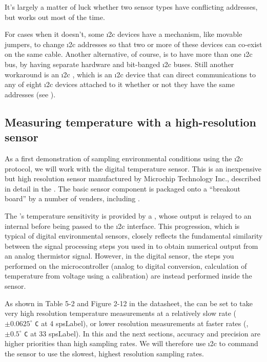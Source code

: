 It's largely a matter of luck whether two sensor types have conflicting addresses, but works out most of the time.

For cases when it doesn't, some \i2c devices have a mechanism, like movable jumpers, to change \i2c addresses so that two or more of these devices can co-exist on the same cable.
Another alternative, of course, is to have more than one \i2c bus, \eg by having separate hardware and bit-banged \i2c buses.
Still another workaround is an \i2c , which is an \i2c device that can direct communications to any of eight \i2c devices attached to it whether or  not they have the same addresses (see ).

\subsection{ Measuring temperature with a high-resolution sensor }
As a first demonstration of sampling environmental conditions using the \i2c protocol, we will work with the  digital temperature sensor.
This is an inexpensive but high resolution sensor manufactured by Microchip Technology Inc., described in detail in the .
The basic sensor component is packaged onto a ``breakout board'' by a number of venders, including .

The 's temperature sensitivity is provided by a , whose output is relayed to an internal \adc before being passed to the \i2c interface.
This progression, which is typical of digital environmental sensors, closely reflects the fundamental similarity between the signal processing steps you used in  to obtain numerical output from an analog thermistor signal.
However, in the digital sensor, the steps you performed on the microcontroller (analog to digital conversion, calculation of temperature from voltage using a calibration) are instead performed inside the sensor.

As shown in Table 5-2 and Figure 2-12 in the datasheet, the  can be set to take very high resolution temperature measurements at a relatively slow rate ($\pm 0.0625^\circ$ \texttt{C} at 4 \gls{spsLabel}), or lower resolution measurements at faster rates (\eg,$\pm 0.5 ^\circ$ \texttt{C} at 33 \gls{spsLabel}).
In this and the next sections, accuracy and precision are higher priorities than high sampling rates.
We will therefore use \i2c to command the sensor to use the slowest, highest resolution sampling rates.

